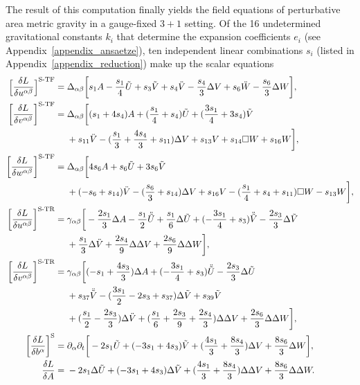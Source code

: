 The result of this computation finally yields the field equations of perturbative area metric gravity in a gauge-fixed $3+1$ setting. Of the 16 undetermined gravitational constants $k_i$ that determine the expansion coefficients $e_i$ (see Appendix~\ref{appendix_ansaetze}), ten independent linear combinations $s_i$ (listed in Appendix~\ref{appendix_reduction}) make up the scalar equations
\begingroup\allowdisplaybreaks
\begin{align}\footnotesize
  \bigg\lbrack\frac{\delta L}{\delta u^{\alpha\beta}}\bigg\rbrack^\text{S-TF} = {} & \Delta_{\alpha\beta} \bigg\lbrack s_1 A -\frac{s_1}{4} \tilde U + s_3 \tilde V + s_4 \ddot V - \frac{s_4}{3} \Delta V + s_6 \ddot W - \frac{s_6}{3} \Delta W\bigg\rbrack, \nonumber \\
  \bigg\lbrack\frac{\delta L}{\delta v^{\alpha\beta}}\bigg\rbrack^\text{S-TF} = {} & \Delta_{\alpha\beta} \bigg\lbrack (s_1 + 4s_4) A + (\frac{s_1}{4} + s_4) \tilde U + (\frac{3s_1}{4} + 3 s_4) \tilde V \nonumber \\ & + s_{11} \ddot V - (\frac{s_1}{3} + \frac{4s_4}{3} + s_{11}) \Delta V + s_{13} V + s_{14} \Box W + s_{16} W \bigg\rbrack, \nonumber \\
  \bigg\lbrack\frac{\delta L}{\delta w^{\alpha\beta}}\bigg\rbrack^\text{S-TF} = {} & \Delta_{\alpha\beta} \bigg\lbrack 4s_6 A + s_6 \tilde U + 3 s_6 \tilde V \nonumber \\ & + (-s_6 + s_{14}) \ddot V - (\frac{s_6}{3} + s_{14}) \Delta V + s_{16} V - (\frac{s_1}{4} + s_4 + s_{11}) \Box W - s_{13} W \bigg\rbrack, \nonumber \\
  \bigg\lbrack\frac{\delta L}{\delta u^{\alpha\beta}}\bigg\rbrack^\text{S-TR} = {} & \gamma_{\alpha\beta} \bigg\lbrack -\frac{2s_1}{3} \Delta A -\frac{s_1}{2} \ddot{\tilde U} + \frac{s_1}{6} \Delta\tilde U + (-\frac{3s_1}{4} + s_3) \ddot{\tilde V} -\frac{2s_3}{3} \Delta\tilde V \nonumber \\ & + \frac{s_1}{3} \Delta\ddot V + \frac{2s_4}{9} \Delta\Delta V + \frac{2s_6}{9} \Delta\Delta W\bigg\rbrack, \nonumber \\
  \bigg\lbrack\frac{\delta L}{\delta v^{\alpha\beta}}\bigg\rbrack^\text{S-TR} = {} & \gamma_{\alpha\beta} \bigg\lbrack (-s_1 + \frac{4s_3}{3}) \Delta A + (-\frac{3s_1}{4} + s_3) \ddot{\tilde U} - \frac{2s_3}{3} \Delta\tilde U \nonumber \\ & + s_{37} \ddot{\tilde V} - (\frac{3s_1}{2} - 2s_3 + s_{37}) \Delta\tilde V + s_{39} \tilde V \nonumber \\ & + (\frac{s_1}{2} - \frac{2s_3}{3}) \Delta\ddot V + (\frac{s_1}{6} + \frac{2s_3}{9} + \frac{2s_4}{3}) \Delta\Delta V + \frac{2s_6}{3} \Delta\Delta W\bigg\rbrack, \nonumber \\
  \bigg\lbrack\frac{\delta L}{\delta b^{\alpha}}\bigg\rbrack^\text{S} = {} & \partial_\alpha \partial_t \bigg\lbrack -2s_1\tilde U + (-3s_1 + 4s_3) \tilde V + (\frac{4s_1}{3} + \frac{8s_4}{3}) \Delta V + \frac{8s_6}{3} \Delta W\bigg\rbrack, \nonumber \\
  \frac{\delta L}{\delta A} = {} & -2s_1 \Delta\tilde U + (-3s_1 + 4s_3) \Delta\tilde V + (\frac{4s_1}{3} + \frac{8s_4}{3}) \Delta\Delta V + \frac{8s_6}{3} \Delta\Delta W. \label{scalar_equations}
\end{align}%

